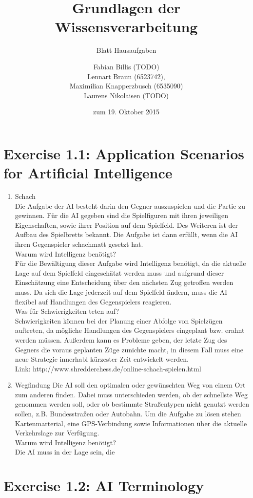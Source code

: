 \documentclass[a4paper]{scrartcl}
\title{Grundlagen der Wissensverarbeitung}
\subtitle{Blatt \blattnr Hausaufgaben}
\author{
    Fabian Billis (TODO) \\
    Lennart Braun (6523742), \\
    Maximilian Knapperzbusch (6535090) \\
    Laurens Nikolaisen (TODO)
}
\date{zum 19. Oktober 2015}
\begin{document}
\maketitle

\section*{Exercise 1.1: Application Scenarios for Artificial Intelligence}
  \begin{enumerate}
    \item{Schach} \\
      Die Aufgabe der AI besteht darin den Gegner auszuspielen und die Partie zu
      gewinnen. Für die AI gegeben sind die Spielfiguren mit ihren jeweiligen
      Eigenschaften, sowie ihrer Position auf dem Spielfeld. Des Weiteren ist der
      Aufbau des Spielbretts bekannt.
      Die Aufgabe ist dann erfüllt, wenn die AI ihren Gegenspieler schachmatt gesetzt
      hat. \\

      Warum wird Intelligenz benötigt? \\
      Für die Bewältigung dieser Aufgabe wird Intelligenz benötigt, da die aktuelle
      Lage auf dem Spielfeld eingeschätzt werden muss und aufgrund dieser Einschätzung
      eine Entscheidung über den nächsten Zug getroffen werden muss. Da sich die Lage
      jederzeit auf dem Spielfeld ändern, muss die AI flexibel auf Handlungen
      des Gegenspielers reagieren. \\

      Was für Schwierigkeiten teten auf?\\
      Schwierigkeiten können bei der Planung einer Abfolge von Spielzügen auftreten,
      da mögliche Handlungen des Gegenspielers eingeplant bzw. erahnt werden müssen.
      Außerdem kann es Probleme geben, der letzte Zug des Gegners die voraus geplanten
      Züge zunichte macht, in diesem Fall muss eine neue Strategie innerhabl kürzester
      Zeit entwickelt werden. \\

      Link: http://www.shredderchess.de/online-schach-spielen.html



    \item{Wegfindung}
      Die AI soll den optimalen oder gewünschten Weg von einem Ort zum anderen finden.
      Dabei muss unterschieden werden, ob der schnellste Weg genommen werden soll, oder
      ob bestimmte Straßentypen nicht genutzt werden sollen, z.B. Bundesstraßen oder
      Autobahn. Um die Aufgabe zu lösen stehen Kartenmarterial, eine GPS-Verbindung
      sowie Informationen über die aktuelle Verkehrslage zur Verfügung.  \\

      Warum wird Intelligenz benötigt? \\
      Die AI muss in der Lage sein, die 

\end{enumerate}


\section*{Exercise 1.2: AI Terminology}
\end{document}
